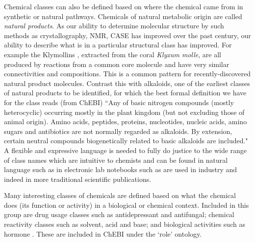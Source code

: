 \documentclass[10pt]{bmc_article}
\newenvironment{bmcformat}{\baselineskip20pt\sloppy\setboolean{publ}{false}}{\baselineskip20pt\sloppy}
\begin{document}
\begin{bmcformat}
Chemical classes can also be defined based on where the chemical came from in synthetic or natural pathways. Chemicals of natural metabolic origin are called \textit{natural products}.  As our ability to determine molecular structure by such methods as crystallography, NMR, CASE has improved over the past century, our ability to describe what is in a particular structural class has improved.  For example the Klymollins \cite{hsu2011}, extracted from the coral \textit{Klyxum molle},
are all produced by reactions from a common core molecule and have very similar connectivities and compositions. This is a common pattern for recently-discovered natural product molecules.  Contrast this with alkaloids, one of the earliest classes of natural products to be identified, for which the best formal definition we have for the class reads (from ChEBI) ``Any of basic nitrogen compounds (mostly heterocyclic) occurring mostly in the plant kingdom (but not excluding those of animal origin). Amino acids, peptides, proteins, nucleotides, nucleic acids, amino sugars and antibiotics are not normally regarded as alkaloids. By extension, certain neutral compounds biogenetically related to basic alkaloids are included." A flexible and expressive language is needed to fully do justice to the wide range of class names which are intuitive to chemists and can be found in natural language such as in electronic lab notebooks such as are used in industry and indeed in more traditional scientific publications. 

Many interesting classes of chemicals are defined based on what the chemical does (its function or activity) in a biological or chemical context. Included in this group are drug usage classes such as antidepressant and antifungal; chemical reactivity classes such as solvent, acid and base; and biological activities such as hormone \cite{batchelor2010}. These are included in ChEBI under the `role' ontology. 


\end{bmcformat}
\end{document}
